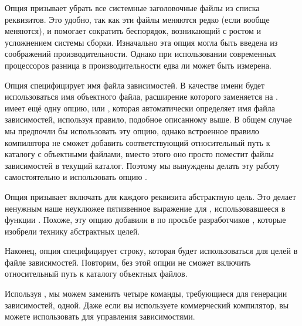 Опция  призывает  убрать все системные
заголовочные файлы из списка реквизитов. Это удобно, так как эти файлы
меняются редко (если вообще меняются), и помогает сократить
беспорядок, возникающий с ростом и усложнением системы сборки.
Изначально эта опция могла быть введена из соображений
производительности. Однако при использовании современных процессоров
разница в производительности едва ли может быть измерена.

Опция  специфицирует имя файла зависимостей. В качестве
имени будет использоваться имя объектного файла, расширение которого
заменяется на .  имеет ещё одну опцию,
 или , которая автоматически определяет имя
файла зависимостей, используя правило, подобное описанному выше. В
общем случае мы предпочли бы использовать эту опцию, однако встроенное
правило компилятора не сможет добавить соответствующий относительный
путь к каталогу с объектными файлами, вместо этого оно просто поместит
файлы зависимостей в текущий каталог. Поэтому мы вынуждены делать эту
работу самостоятельно и использовать опцию .

Опция  призывает  включать для каждого
реквизита абстрактную цель. Это делает ненужным наше неуклюжее
пятизвенное выражение для , использовавшееся в функции
. Похоже, эту опцию добавили в  по
просьбе разработчиков , которые изобрели технику
абстрактных целей. 

Наконец, опция  специфицирует строку, которая будет
использоваться для целей в файле зависимостей. Повторим, без этой
опции  не сможет включить относительный путь к каталогу
объектных файлов.

Используя , мы можем заменить четыре команды, требующиеся
для генерации зависимостей, одной. Даже если вы используете
коммерческий компилятор, вы можете использовать  для
управления зависимостями.
